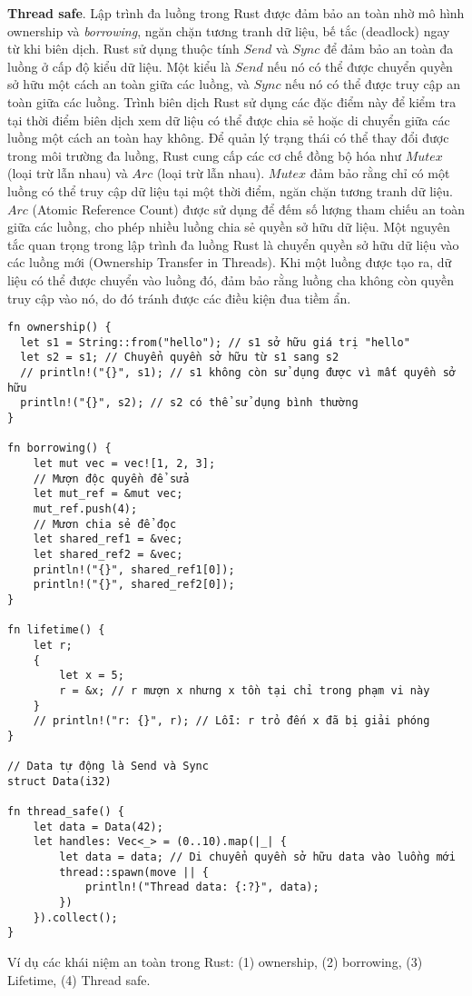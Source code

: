 \textbf{Thread safe}. Lập trình đa luồng trong Rust được đảm bảo an toàn nhờ mô hình ownership và \textit{borrowing}, ngăn chặn tương tranh dữ liệu, bế tắc (deadlock) ngay từ khi biên dịch.
Rust sử dụng thuộc tính $Send$ và $Sync$ để đảm bảo an toàn đa luồng ở cấp độ kiểu dữ liệu.
Một kiểu là $Send$ nếu nó có thể được chuyển quyền sở hữu một cách an toàn giữa các luồng, và $Sync$ nếu nó có thể được truy cập an toàn giữa các luồng.
Trình biên dịch Rust sử dụng các đặc điểm này để kiểm tra tại thời điểm biên dịch xem dữ liệu có thể được chia sẻ hoặc di chuyển giữa các luồng một cách an toàn hay không.
Để quản lý trạng thái có thể thay đổi được trong môi trường đa luồng, Rust cung cấp các cơ chế đồng bộ hóa như $Mutex$ (loại trừ lẫn nhau) và $Arc$ (loại trừ lẫn nhau).
$Mutex$ đảm bảo rằng chỉ có một luồng có thể truy cập dữ liệu tại một thời điểm, ngăn chặn tương tranh dữ liệu.
$Arc$ (Atomic Reference Count) được sử dụng để đếm số lượng tham chiếu an toàn giữa các luồng, cho phép nhiều luồng chia sẻ quyền sở hữu dữ liệu.
Một nguyên tắc quan trọng trong lập trình đa luồng Rust là chuyển quyền sở hữu dữ liệu vào các luồng mới (Ownership Transfer in Threads).
Khi một luồng được tạo ra, dữ liệu có thể được chuyển vào luồng đó, đảm bảo rằng luồng cha không còn quyền truy cập vào nó, do đó tránh được các điều kiện đua tiềm ẩn.


\begin{listing}[H]
\begin{verbatim}
fn ownership() {
  let s1 = String::from("hello"); // s1 sở hữu giá trị "hello"
  let s2 = s1; // Chuyển quyền sở hữu từ s1 sang s2
  // println!("{}", s1); // s1 không còn sử dụng được vì mất quyền sở hữu
  println!("{}", s2); // s2 có thể sử dụng bình thường
}

fn borrowing() {
    let mut vec = vec![1, 2, 3];
    // Mượn độc quyền để sửa
    let mut_ref = &mut vec;
    mut_ref.push(4);
    // Mươn chia sẻ để đọc
    let shared_ref1 = &vec;
    let shared_ref2 = &vec;
    println!("{}", shared_ref1[0]);
    println!("{}", shared_ref2[0]);
}

fn lifetime() {
    let r;
    {
        let x = 5;
        r = &x; // r mượn x nhưng x tồn tại chỉ trong phạm vi này
    }
    // println!("r: {}", r); // Lỗi: r trỏ đến x đã bị giải phóng
}

// Data tự động là Send và Sync
struct Data(i32)

fn thread_safe() {
    let data = Data(42);
    let handles: Vec<_> = (0..10).map(|_| {
        let data = data; // Di chuyển quyền sở hữu data vào luồng mới
        thread::spawn(move || {
            println!("Thread data: {:?}", data);
        })
    }).collect();
}
\end{verbatim}
\caption{Ví dụ các khái niệm an toàn trong Rust: (1) ownership, (2) borrowing, (3) Lifetime, (4) Thread safe.}
\label{code:c2_safe_rust}
\end{listing}


